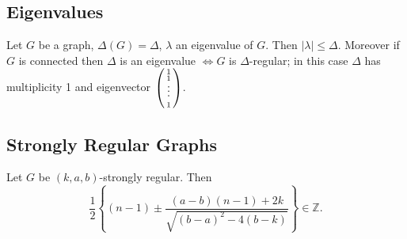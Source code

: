 \documentclass{article}
\begin{document}
\subsection{Eigenvalues}































\begin{nthm}\label{thm:46}
    Let $G$ be a graph, $\Delta(G) = \Delta$, $\lambda$ an eigenvalue of $G$.
    Then $|\lambda| \leq \Delta$.
    Moreover if $G$ is connected then $\Delta$ is an eigenvalue $\iff G$ is $\Delta$-regular; in this case $\Delta$ has multiplicity 1 and eigenvector $\left(\begin{smallmatrix}1\\1\\  \vphantom{\int\limits^x}\smash{\vdots}\\1\end{smallmatrix}\right)$.
\end{nthm}

\subsection{Strongly Regular Graphs}












\begin{nthm}\label{thm:47}
    Let $G$ be $(k,a,b)$-strongly regular.
    Then
    \begin{equation*}
        \frac{1}{2} \left\{ (n-1) \pm \frac{(a-b)(n-1) + 2k}{\sqrt{(b-a)^2 - 4(b-k)}}\right\} \in \mathbb{Z}.
    \end{equation*}
\end{nthm}
\end{document}
